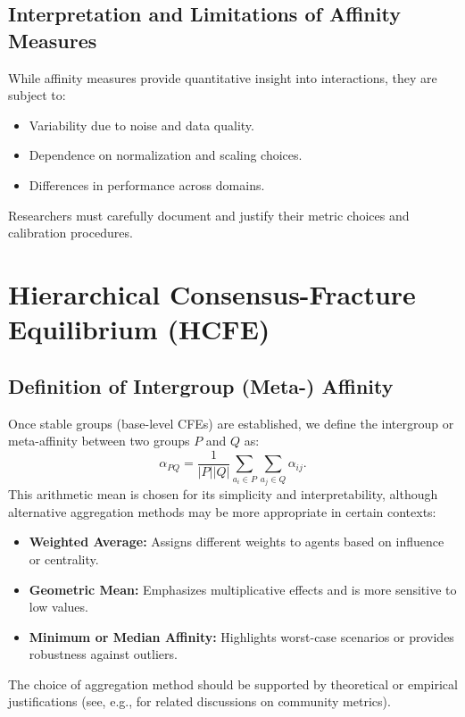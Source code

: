\documentclass{article}
\begin{document}
\subsection{Interpretation and Limitations of Affinity Measures}
While affinity measures provide quantitative insight into interactions, they are subject to:
\begin{itemize}
  \item Variability due to noise and data quality.
  \item Dependence on normalization and scaling choices.
  \item Differences in performance across domains.
\end{itemize}
Researchers must carefully document and justify their metric choices and calibration procedures.

\section{Hierarchical Consensus-Fracture Equilibrium (HCFE)}

\subsection{Definition of Intergroup (Meta-) Affinity}
Once stable groups (base-level CFEs) are established, we define the intergroup or meta-affinity between two groups $P$ and $Q$ as:
\[
\alpha_{PQ} = \frac{1}{|P||Q|}\sum_{a_i\in P}\sum_{a_j\in Q}\alpha_{ij}.
\]
This arithmetic mean is chosen for its simplicity and interpretability, although alternative aggregation methods may be more appropriate in certain contexts:
\begin{itemize}
  \item \textbf{Weighted Average:} Assigns different weights to agents based on influence or centrality.
  \item \textbf{Geometric Mean:} Emphasizes multiplicative effects and is more sensitive to low values.
  \item \textbf{Minimum or Median Affinity:} Highlights worst-case scenarios or provides robustness against outliers.
\end{itemize}
The choice of aggregation method should be supported by theoretical or empirical justifications (see, e.g., \cite{blondel2008fast} for related discussions on community metrics).
\end{document}
